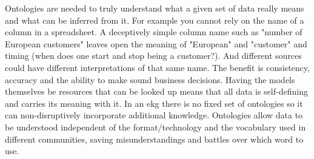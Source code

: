 Ontologies are needed to truly understand what a given set of data really means and what can be inferred from it.
For example you cannot rely on the name of a column in a spreadsheet.
A deceptively simple column name such as "number of European customers" leaves open the meaning of
"European" and "customer" and timing (when does one start and stop being a customer?).
And different sources could have different interpretations of that same name.
The benefit is consistency, accuracy and the ability to make sound business decisions.
Having the models themselves be resources that can be looked up means that all data is self-defining and
carries its meaning with it.
In an \gls{ekg} there is no fixed set of ontologies so it can non-disruptively incorporate additional knowledge.
Ontologies allow data to be understood independent of the format/technology and the vocabulary used in
different communities, saving misunderstandings and battles over which word to use.

